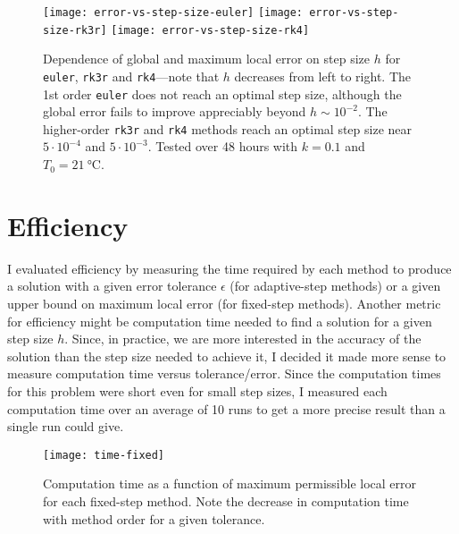 \documentclass[11pt, a4paper]{article}
\begin{document}
\begin{figure}
\centering

{\texttt{[image: error-vs-step-size-euler]}}
\vfill
{\texttt{[image: error-vs-step-size-rk3r]}} \vfill
{\texttt{[image: error-vs-step-size-rk4]}} \vfill

\caption{Dependence of global and maximum local error on step size $ h $ for \texttt{euler}, \texttt{rk3r} and \texttt{rk4}---note that $ h $ decreases from left to right. The 1st order \texttt{euler} does not reach an optimal step size, although the global error fails to improve appreciably beyond $ h \sim 10^{-2} $. The higher-order \texttt{rk3r} and \texttt{rk4} methods reach an optimal step size near $ 5\cdot 10^{-4} $ and $ 5 \cdot 10^{-3} $. Tested over 48 hours with $ k = 0.1 $ and $ T_{0} = \SI{21}{\degreeCelsius}$.} 

\label{ivp:fig:error-vs-step-size}

\end{figure} 


\section{Efficiency}
I evaluated efficiency by measuring the time required by each method to produce a solution with a given error tolerance $ \epsilon $ (for adaptive-step methods) or a given upper bound on maximum local error (for fixed-step methods). Another metric for efficiency might be computation time needed to find a solution for a given step size $ h $. Since, in practice, we are more interested in the accuracy of the solution than the step size needed to achieve it, I decided it made more sense to measure computation time versus tolerance/error. Since the computation times for this problem were short even for small step sizes, I measured each computation time over an average of 10 runs to get a more precise result than a single run could give.


\begin{figure}[htb!]
\centering
\texttt{[image: time-fixed]}

\caption{Computation time as a function of maximum permissible local error for each fixed-step method. Note the decrease in computation time with method order for a given tolerance.} 

\label{ivp:fig:time-fixed}

\end{figure} 
\end{document}
